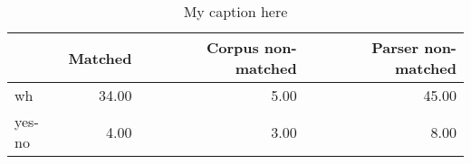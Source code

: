 \begin{table}[!ht]
\centering
\begin{tabular}{lrrr}
\toprule
{} &  Matched &  Corpus non-matched &  Parser non-matched \\
\midrule
wh     &    34.00 &                5.00 &               45.00 \\
yes-no &     4.00 &                3.00 &                8.00 \\
\bottomrule
\end{tabular}
\caption{My caption here}
\label{tab:INTERROGATIVE-ocd-data}
\end{table}